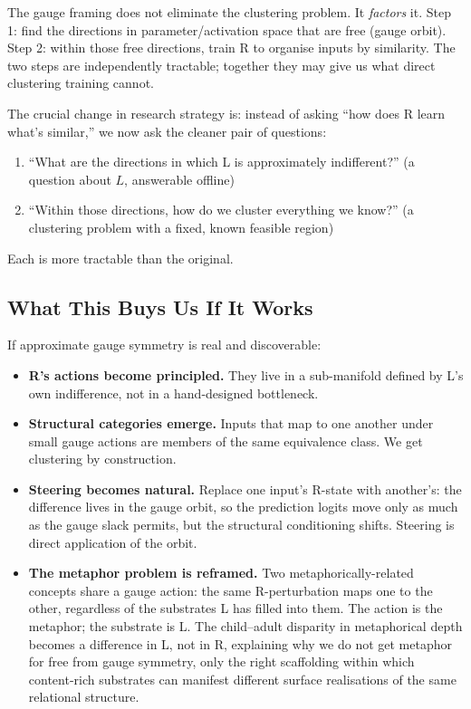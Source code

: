 \documentclass[11pt, a4paper]{article}
\theoremstyle{plain}
\theoremstyle{definition}
\theoremstyle{remark}
\begin{document}
The gauge framing does not eliminate the clustering problem.
It \emph{factors} it.
Step 1: find the directions in parameter/activation space that are free (gauge orbit).
Step 2: within those free directions, train R to organise inputs by similarity.
The two steps are independently tractable; together they may give us what direct clustering training cannot.

The crucial change in research strategy is: instead of asking ``how does R learn what's similar,'' we now ask the cleaner pair of questions:
\begin{enumerate}[nosep]
\item ``What are the directions in which L is approximately indifferent?'' (a question about $L$, answerable offline)
\item ``Within those directions, how do we cluster everything we know?'' (a clustering problem with a fixed, known feasible region)
\end{enumerate}
Each is more tractable than the original.

\subsection{What This Buys Us If It Works}

If approximate gauge symmetry is real and discoverable:
\begin{itemize}[nosep]
\item \textbf{R's actions become principled.} They live in a sub-manifold defined by L's own indifference, not in a hand-designed bottleneck.
\item \textbf{Structural categories emerge.} Inputs that map to one another under small gauge actions are members of the same equivalence class. We get clustering by construction.
\item \textbf{Steering becomes natural.} Replace one input's R-state with another's: the difference lives in the gauge orbit, so the prediction logits move only as much as the gauge slack permits, but the structural conditioning shifts. Steering is direct application of the orbit.
\item \textbf{The metaphor problem is reframed.} Two metaphorically-related concepts share a gauge action: the same R-perturbation maps one to the other, regardless of the substrates L has filled into them. The action is the metaphor; the substrate is L. The child--adult disparity in metaphorical depth becomes a difference in L, not in R, explaining why we do not get metaphor for free from gauge symmetry, only the right scaffolding within which content-rich substrates can manifest different surface realisations of the same relational structure.
\end{itemize}
\end{document}
